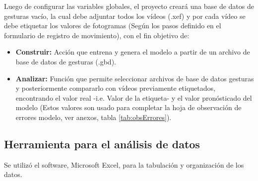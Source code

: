 Luego de configurar las variables globales, el proyecto crear\'a una base de datos de gesturas vac\'io, la cual debe adjuntar todos los v\'ideos (.xef)  y por cada v\'ideo se debe etiquetar los valores de fotogramas (Seg\'un los pasos definido en el formulario de registro de movimiento), con el fin objetivo de: 
\begin{itemize}
\item \textbf{Construir:} Acci\'on que entrena y genera el modelo a partir de un archivo de base de datos de gesturas (.gbd).
\item \textbf{Analizar:} Funci\'on que permite seleccionar archivos de base de datos gesturas y posteriormente compararlo con v\'ideos previamente etiquetados, encontrando el valor real -i.e. Valor de la etiqueta- y el valor pron\'osticado del modelo (Estos valores son usado para completar la hoja de observaci\'on de errores modelo, ver anexos, tabla \ref{tab:obsErrores}).
\end{itemize}
\subsection{Herramienta para el an\'alisis de datos} \label{ins:toolsAn}
Se utiliz\'o el software, Microsoft Excel, para la tabulaci\'on y organizaci\'on de los datos.